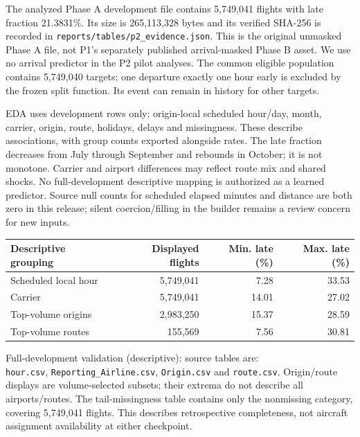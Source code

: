 \documentclass{article}
\begin{document}
The analyzed Phase A development file contains 5,749,041 flights with late fraction 21.3831\%. Its size is 265,113,328 bytes and its verified SHA-256 is recorded in \texttt{reports/tables/p2\_evidence.json}. This is the original unmasked Phase A file, not P1's separately published arrival-masked Phase B asset. We use no arrival predictor in the P2 pilot analyses. The common eligible population contains 5,749,040 targets; one departure exactly one hour early is excluded by the frozen split function. Its event can remain in history for other targets.

EDA uses development rows only: origin-local scheduled hour/day, month, carrier, origin, route, holidays, delays and missingness. These describe associations, with group counts exported alongside rates. The late fraction decreases from July through September and rebounds in October; it is not monotone. Carrier and airport differences may reflect route mix and shared shocks. No full-development descriptive mapping is authorized as a learned predictor. Source null counts for scheduled elapsed minutes and distance are both zero in this release; silent coercion/filling in the builder remains a review concern for new inputs.

\begin{center}\small
\begin{tabular}{lrrr}\toprule
Descriptive grouping & Displayed flights & Min. late (\%) & Max. late (\%) \\\midrule
Scheduled local hour & 5,749,041 & 7.28 & 33.53 \\
Carrier & 5,749,041 & 14.01 & 27.02 \\
Top-volume origins & 2,983,250 & 15.37 & 28.59 \\
Top-volume routes & 155,569 & 7.56 & 30.81 \\
\bottomrule\end{tabular}\end{center}
\noindent Full-development validation (descriptive): source tables are:\\
\texttt{hour.csv}, \texttt{Reporting\_Airline.csv},
\texttt{Origin.csv} and \texttt{route.csv}.
Origin/route displays are volume-selected subsets; their extrema do not describe all airports/routes.
The tail-missingness table contains only the nonmissing category, covering 5,749,041 flights.
This describes retrospective completeness, not aircraft assignment availability at either checkpoint.
\end{document}
